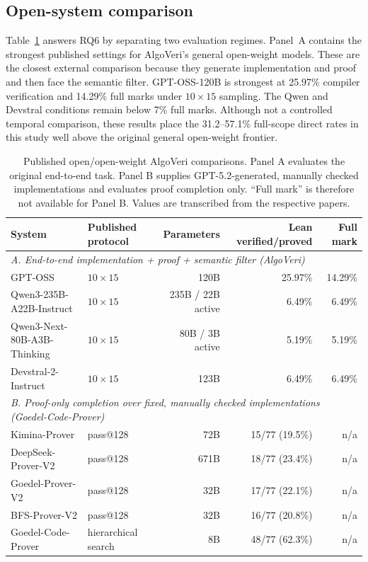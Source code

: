 \documentclass{article}
\begin{document}
\subsection{Open-system comparison}
\label{sec:open-comparison}

Table~\ref{tab:open-comparison} answers RQ6 by separating two evaluation regimes.
Panel~A contains the strongest published settings for AlgoVeri's general open-weight
models.  These are the closest external comparison because they generate implementation
and proof and then face the semantic filter.  GPT-OSS-120B is strongest at 25.97\%
compiler verification and 14.29\% full marks under $10\times15$ sampling.  The Qwen and
Devstral conditions remain below 7\% full marks.  Although not a controlled temporal
comparison, these results place the 31.2--57.1\% full-scope direct rates in this study
well above the original general open-weight frontier.

\begin{table}[t]
\centering
\small
\caption{Published open/open-weight AlgoVeri comparisons.  Panel A evaluates the
original end-to-end task.  Panel B supplies GPT-5.2-generated, manually checked
implementations and evaluates proof completion only.  ``Full mark'' is therefore not
available for Panel B.  Values are transcribed from the respective papers.}
\label{tab:open-comparison}
\begin{tabular}{llrrr}
\toprule
System & Published protocol & Parameters & Lean verified/proved & Full mark \\
\midrule
\multicolumn{5}{l}{\emph{A. End-to-end implementation + proof + semantic filter (AlgoVeri)}} \\
GPT-OSS & $10\times15$ & 120B & 25.97\% & 14.29\% \\
Qwen3-235B-A22B-Instruct & $10\times15$ & 235B / 22B active & 6.49\% & 6.49\% \\
Qwen3-Next-80B-A3B-Thinking & $10\times15$ & 80B / 3B active & 5.19\% & 5.19\% \\
Devstral-2-Instruct & $10\times15$ & 123B & 6.49\% & 6.49\% \\
\midrule
\multicolumn{5}{l}{\emph{B. Proof-only completion over fixed, manually checked implementations (Goedel-Code-Prover)}} \\
Kimina-Prover & pass@128 & 72B & 15/77 (19.5\%) & n/a \\
DeepSeek-Prover-V2 & pass@128 & 671B & 18/77 (23.4\%) & n/a \\
Goedel-Prover-V2 & pass@128 & 32B & 17/77 (22.1\%) & n/a \\
BFS-Prover-V2 & pass@128 & 32B & 16/77 (20.8\%) & n/a \\
Goedel-Code-Prover & hierarchical search & 8B & 48/77 (62.3\%) & n/a \\
\bottomrule
\end{tabular}
\end{table}
\end{document}
